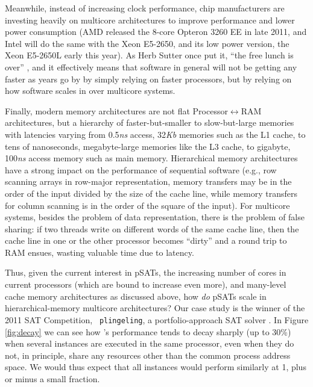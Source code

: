 \documentclass{llncs}
\begin{document}
Meanwhile, instead of increasing clock performance, chip manufacturers
are investing heavily on multicore architectures to improve
performance and lower power consumption (AMD released the 8-core
Opteron 3260 EE in late 2011, and Intel will do the same with the Xeon
E5-2650, and its low power version, the Xeon E5-2650L early this
year). As Herb Sutter once put it, ``the free lunch is over''
\cite{FreeLunchIsOver}, and it effectively means that software in
general will not be getting any faster as years go by by simply
relying on faster processors, but by relying on how software scales in
over multicore systems.

Finally, modern memory architectures are not flat
Processor$\leftrightarrow$RAM architectures, but a hierarchy of
faster-but-smaller to slow-but-large memories with latencies varying
from 0.5{\it ns} access, 32{\it Kb} memories such as the L1 cache, to
tens of nanoseconds, megabyte-large memories like the L3 cache, to
gigabyte, 100{\it ns} access memory such as main memory. Hierarchical
memory architectures have a strong impact on the performance of
sequential software (e.g., row scanning arrays in row-major
representation, memory transfers may be in the order of the input
divided by the size of the cache line, while memory transfers for
column scanning is in the order of the square of the input). For
multicore systems, besides the problem of data representation, there
is the problem of false sharing: if two threads write on different
words of the same cache line, then the cache line in one or the other
processor becomes ``dirty'' and a round trip to RAM ensues, wasting
valuable time due to latency.

Thus, given the current interest in pSATs, the increasing number of
cores in current processors (which are bound to increase even more),
and many-level cache memory architectures as discussed above, how {\em
  do} pSATs scale in hierarchical-memory multicore architectures? Our
case study is the winner of the 2011 SAT Competition, {\tt
  plingeling}, a portfolio-approach SAT solver \cite{lingeling}. In
Figure \ref{fig:decay} we can see how \pling's performance tends to
decay sharply (up to 30\%) when several instances are executed in the
same processor, even when they do not, in principle, share any
resources other than the common process address space. We would thus
expect that all instances would perform similarly at 1, plus or minus
a small fraction.
\end{document}
